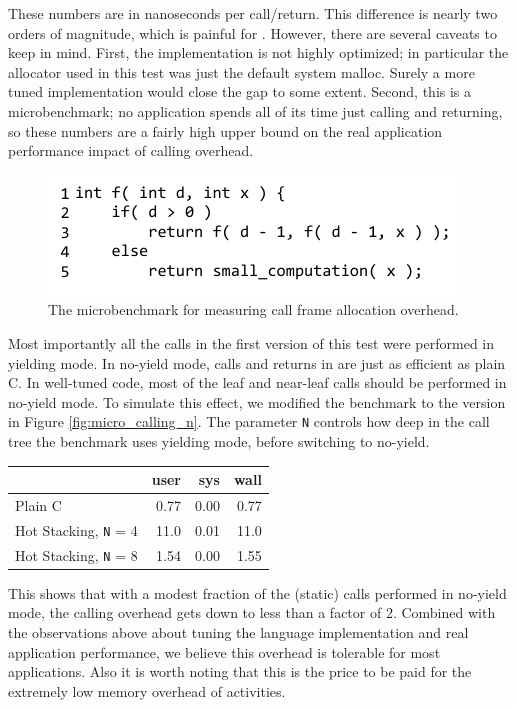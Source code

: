 \documentclass[pldi,10pt,preprint]{sigplanconf-pldi16}
\begin{document}
These numbers are in nanoseconds per call/return.
This difference is nearly two orders of magnitude, which is painful for \charcoal{}.
However, there are several caveats to keep in mind.
First, the \charcoal{} implementation is not highly optimized; in particular the allocator used in this test was just the default system malloc.
Surely a more tuned implementation would close the gap to some extent.
Second, this is a microbenchmark; no application spends all of its time just calling and returning, so these numbers are a fairly high upper bound on the real application performance impact of calling overhead.

\begin{figure}
\includegraphics{just_calling_benchmark}
\caption{The microbenchmark for measuring call frame allocation overhead.}
\label{fig:micro_calling}
\end{figure}

Most importantly all the calls in the first version of this test were performed in yielding mode.
In no-yield mode, calls and returns in \charcoal{} are just as efficient as plain C.
In well-tuned \charcoal{} code, most of the leaf and near-leaf calls should be performed in no-yield mode.
To simulate this effect, we modified the benchmark to the version in Figure \ref{fig:micro_calling_n}.
The parameter \texttt{N} controls how deep in the call tree the benchmark uses yielding mode, before switching to no-yield.

\vspace{1em}
\begin{tabular}{|l|r|r|r|}
  \hline
   & user & sys & wall \\
  \hline
  \hline
  Plain C & 0.77 & 0.00 & 0.77 \\
  \hline
  Hot Stacking, \texttt{N} = 4 & 11.0 & 0.01 & 11.0 \\
  \hline
  Hot Stacking, \texttt{N} = 8 & 1.54 & 0.00 & 1.55 \\
  \hline
\end{tabular}
\vspace{1em}

This shows that with a modest fraction of the (static) calls performed in no-yield mode, the calling overhead gets down to less than a factor of 2.
Combined with the observations above about tuning the language implementation and real application performance, we believe this overhead is tolerable for most applications.
Also it is worth noting that this is the price to be paid for the extremely low memory overhead of activities.
\end{document}
